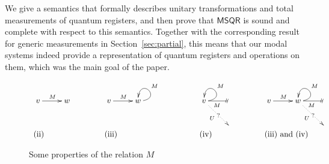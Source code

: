 \documentclass[times, 10pt]{article}
\newcommand{\MSQR}{\textsf{MSQR}}
\begin{document}
\label{sec:semantics}


We give a semantics that formally describes unitary transformations and total measurements of quantum registers, and then prove that 
$\MSQR$ is sound and complete with respect to this semantics. Together with the corresponding result for generic measurements in Section~\ref{sec:partial}, this means that our modal systems indeed provide a representation of quantum registers and operations on them, which was the main goal of the paper.

\begin{figure*}
\begin{displaymath}
\begin{array}{llll}
\xymatrix{
v \ar[r]^M & w &
}
&
\xymatrix{
v \ar[r]^M & w\ar@(r,u)[]_M & &
}
&
\xymatrix{
v\ar@(r,u)[]_M \ar@{-//}[r]_M \ar@{.>}[dr]|-{?}_U & \\
& & 
}
&
\xymatrix{
v \ar[r]^M & w\ar@(r,u)[]_M \ar@{-//}[r]_M \ar@{.>}[dr]|-{?}_U & \\
& & 
} \\
\text{(ii)} & \text{(iii)} & \text{(iv)} & \text{(iii) and (iv)}
\end{array}
\end{displaymath}
\caption{Some properties of the relation $M$}
\label{fig:properties}
\end{figure*}
\end{document}
